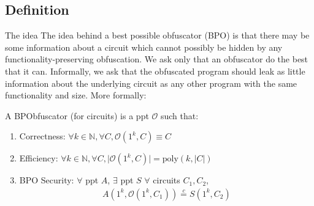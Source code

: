\documentclass{article}
\newcommand{\ci}{\stackrel{c}{=}}
\begin{document}
\subsection{Definition}
The idea The idea behind a best possible obfuscator (BPO) is that there may be some information about a circuit which cannot possibly be hidden by any functionality-preserving obfuscation. We ask only that an obfuscator do the best that it can. Informally, we ask that the obfuscated program should leak as little information about the underlying circuit as any other program with the same functionality and size. More formally:

    A BPObfuscator (for circuits) is a ppt $\mathcal{O}$ such that:
    \begin{enumerate}
        \item Correctness: $\forall{k}\in\mathbb{N}, \forall{C}, \mathcal{O}(1^k, C) \equiv C$
        \item Efficiency: $\forall{k}\in\mathbb{N}, \forall{C}, \lvert \mathcal{O}(1^k, C) \rvert = \text{poly}(k, \lvert C \rvert)$
        \item BPO Security: $\forall$ ppt $A$, $\exists$ ppt $S$ $\forall$ circuits $C_1, C_2$,
        \begin{align*}
            A(1^k, \mathcal{O}(1^k, C_1)) \ci S(1^k, C_2)
        \end{align*}
    \end{enumerate}
\end{document}
